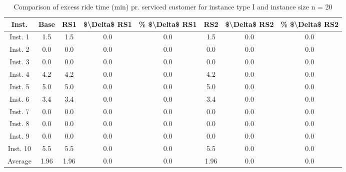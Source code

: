 \begin{table}[H]
\centering
\begin{tabular}{cccccccc}
  \hline
  \textbf{Inst.} & \textbf{Base} & \textbf{RS1} & \textbf{\$\textbackslash{}Delta\$  RS1} & \textbf{\% \$\textbackslash{}Delta\$  RS1} & \textbf{RS2} & \textbf{\$\textbackslash{}Delta\$  RS2} & \textbf{\% \$\textbackslash{}Delta\$  RS2} \\\hline
  Inst. 1 & 1.5 & 1.5 & 0.0 & 0.0 & 1.5 & 0.0 & 0.0 \\
  Inst. 2 & 0.0 & 0.0 & 0.0 & 0.0 & 0.0 & 0.0 & 0.0 \\
  Inst. 3 & 0.0 & 0.0 & 0.0 & 0.0 & 0.0 & 0.0 & 0.0 \\
  Inst. 4 & 4.2 & 4.2 & 0.0 & 0.0 & 4.2 & 0.0 & 0.0 \\
  Inst. 5 & 5.0 & 5.0 & 0.0 & 0.0 & 5.0 & 0.0 & 0.0 \\
  Inst. 6 & 3.4 & 3.4 & 0.0 & 0.0 & 3.4 & 0.0 & 0.0 \\
  Inst. 7 & 0.0 & 0.0 & 0.0 & 0.0 & 0.0 & 0.0 & 0.0 \\
  Inst. 8 & 0.0 & 0.0 & 0.0 & 0.0 & 0.0 & 0.0 & 0.0 \\
  Inst. 9 & 0.0 & 0.0 & 0.0 & 0.0 & 0.0 & 0.0 & 0.0 \\
  Inst. 10 & 5.5 & 5.5 & 0.0 & 0.0 & 5.5 & 0.0 & 0.0 \\
  Average & 1.96 & 1.96 & 0.0 & 0.0 & 1.96 & 0.0 & 0.0 \\\hline
\end{tabular}
\caption{Comparison of excess ride time (min) pr. serviced customer for instance type I and instance size n = 20}
\label{tab:wait:resrelocation-excess-ride-time-comparison_I_20}
\end{table}
